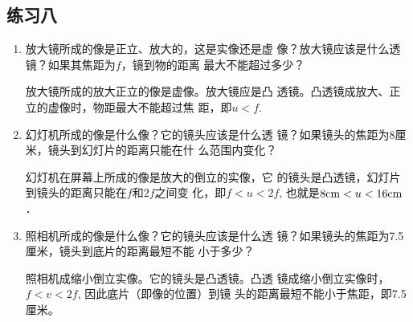\subsection{练习八}
\begin{enumerate}
    \item 放大镜所成的像是正立、放大的，这是实像还是虚
像？放大镜应该是什么透镜？如果其焦距为$f$，镜到物的距离
最大不能超过多少？

\begin{solution}
放大镜所成的放大正立的像是虚像。放大镜应是凸
    透镜。凸透镜成放大、正立的虚像时，物距最大不能超过焦
    距，即$u<f$.
\end{solution}
\item 幻灯机所成的像是什么像？它的镜头应该是什么透
镜？如果镜头的焦距为8厘米，镜头到幻灯片的距离只能在什
么范围内变化？

\begin{solution}
    幻灯机在屏幕上所成的像是放大的倒立的实像，它
    的镜头是凸透镜，幻灯片到镜头的距离只能在$f$和$2f$之间变
    化，即$f<u<2f$, 也就是$8{\rm cm}<u<16{\rm cm}$．
\end{solution}
\item 照相机所成的像是什么像？它的镜头应该是什么透
镜？如果镜头的焦距为7.5厘米，镜头到底片的距离最短不能
小于多少？

\begin{solution}
照相机成缩小倒立实像。它的镜头是凸透镜。凸透
镜成缩小倒立实像时，$f<v<2f$, 因此底片（即像的位置）到镜
头的距离最短不能小于焦距，即7.5厘米。
\end{solution}
\end{enumerate}







